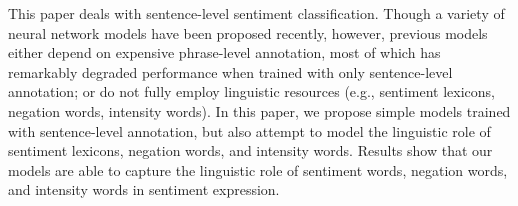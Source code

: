 This paper deals with sentence-level sentiment classification. Though a variety of neural network models have been proposed recently, however, previous models either depend on expensive phrase-level annotation, most of which has remarkably degraded performance when trained with only sentence-level annotation; or do not fully employ linguistic resources (e.g., sentiment lexicons, negation words, intensity words). In this paper, we propose simple models trained with sentence-level annotation, but also attempt to model the linguistic role of sentiment lexicons, negation words, and intensity words. Results show that our models are able to capture the linguistic role of sentiment words, negation words, and intensity words in sentiment expression.
